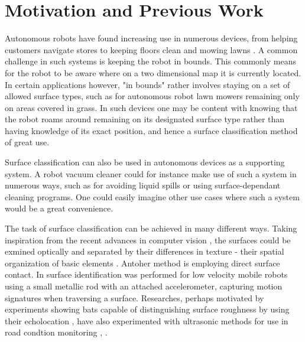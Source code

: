 \section{Motivation and Previous Work}

Autonomous robots have found increasing use in numerous devices, from helping customers navigate stores \citep{mcsweeney_2018} to keeping floors clean \citep{sanfacon_2017} and mowing lawns \citep{udelhofen_2018}. A common challenge in such systems is keeping the robot in bounds. This commonly means for the robot to be aware where on a two dimensional map it is currently located. In certain applications however, "in bounds" rather involves staying on a set of allowed surface types, such as for autonomous robot lawn mowers remaining only on areas covered in grass. In such devices one may be content with knowing that the robot roams around remaining on its designated surface type rather than having knowledge of its exact position, and hence a surface classification method of great use. 

Surface classification can also be used in autonomous devices as a supporting system. A robot vacuum cleaner could for instance make use of such a system in numerous ways, such as for avoiding liquid spills or using surface-dependant cleaning programs. One could easily imagine other use cases where such a system would be a great convenience.

The task of surface classification can be achieved in many different ways. Taking inspiration from the recent advances in computer vision \citep{liu_chen_fieguth_zhao_chellappa_pietikainen_2018}, the surfaces could be exmined optically and separated by their differences in texture - their spatial organization of basic elements \citep{do_vetterli_2002}. Antoher method is employing direct surface contact. In \citep{giguere_dudek_2011} surface identification was performed for low velocity mobile robots using a small metallic rod with an attached accelerometer, capturing motion signatures when traversing a surface. Researches, perhaps motivated by experiments showing bats capable of distinguishing surface roughness by using their echolocation \citep{schmidt_1988}, have also experimented with ultrasonic methods for use in road condtion monitoring \citep{bystrov_2016}, \citep{mckerrow_kristiansen_2006}. 

